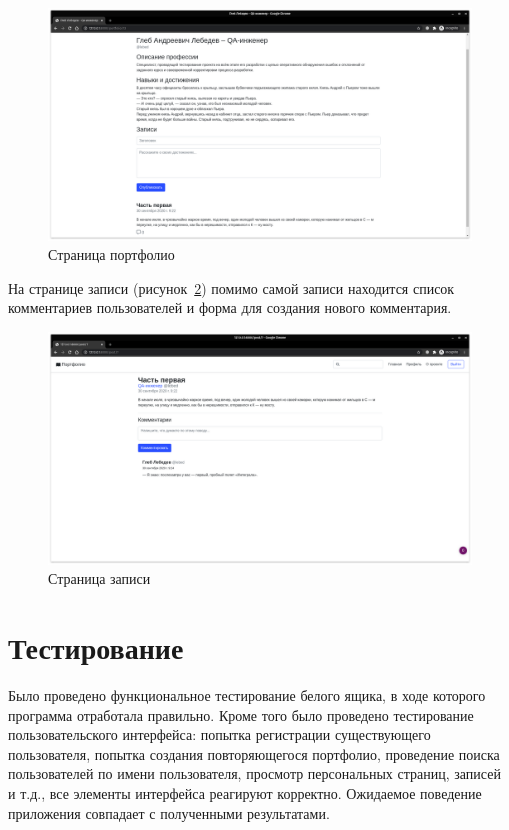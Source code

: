\begin{figure}[H]
    \centering
    \includegraphics[scale=0.235]{images/scr_05.png}
    \caption{Страница портфолио}\label{img:scr_05}
\end{figure}

На странице записи (рисунок~\ref{img:scr_06}) помимо самой записи находится список комментариев пользователей и форма для создания нового комментария.

\begin{figure}[H]
    \centering
    \includegraphics[scale=0.235]{images/scr_06.png}
    \caption{Страница записи}\label{img:scr_06}
\end{figure}

\section{Тестирование}%
\label{sec:aprobatsiia}
Было проведено функциональное тестирование белого ящика, в ходе которого программа отработала правильно. Кроме того было проведено тестирование пользовательского интерфейса: попытка регистрации существующего пользователя, попытка создания повторяющегося портфолио, проведение поиска пользователей по имени пользователя, просмотр персональных страниц, записей и т.д., все элементы интерфейса реагируют корректно. Ожидаемое поведение приложения совпадает с полученными результатами.

